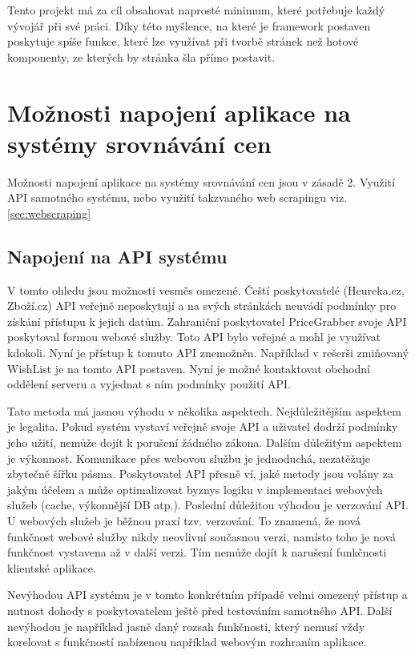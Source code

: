 Tento projekt má za cíl obsahovat naprosté minimum, které potřebuje každý vývojář při své práci\cite{website:boilerplate-history}. Díky této myšlence, na které je framework postaven poskytuje spíše funkce, které lze využívat při tvorbě stránek než hotové komponenty, ze kterých by stránka šla přímo postavit.

\section{Možnosti napojení aplikace na systémy srovnávání cen}
Možnosti napojení aplikace na systémy srovnávání cen jsou v zásadě 2. Využití API samotného systému, nebo využití takzvaného web scrapingu viz. \ref{sec:webscraping}

\subsection{Napojení na API systému}
V tomto ohledu jsou možnosti vesměs omezené. Čeští poskytovatelé (Heureka.cz, Zboží.cz) API veřejně neposkytují a na svých stránkách neuvádí podmínky pro získání přístupu k jejich datům. Zahraniční poskytovatel PriceGrabber svoje API poskytoval formou webové služby. Toto API bylo veřejné a mohl je využívat kdokoli. Nyní je přístup k tomuto API znemožněn\cite{website:pricegrabber-api}. Například v rešerši zmiňovaný WishList je na tomto API postaven. Nyní je možné kontaktovat obchodní oddělení serveru a vyjednat s ním podmínky použití API.

Tato metoda má jasnou výhodu v několika aspektech. Nejdůležitějším aspektem je legalita. Pokud systém vystaví veřejně svoje API a uživatel dodrží podmínky jeho užití, nemůže dojít k porušení žádného zákona. Dalším důležitým aspektem je výkonnost. Komunikace přes webovou službu je jednoduchá, nezatěžuje zbytečně šířku pásma. Poskytovatel API přesně ví, jaké metody jsou volány za jakým účelem a může optimalizovat byznys logiku v implementaci webových služeb (cache, výkonnější DB atp.). Poslední důležitou výhodou je verzování API. U webových služeb je běžnou praxí tzv. verzování\cite{josuttis2007soa}. To znamená, že nová funkčnost webové služby nikdy neovlivní současnou verzi, namísto toho je nová funkčnost vystavena až v další verzi. Tím nemůže dojít k narušení funkčnosti klientské aplikace.

Nevýhodou API systému je v tomto konkrétním případě velmi omezený přístup a nutnost dohody s poskytovatelem ještě před testováním samotného API. Další nevýhodou je například jasně daný rozsah funkčnosti, který nemusí vždy korelovat s funkčností nabízenou například webovým rozhraním aplikace.

